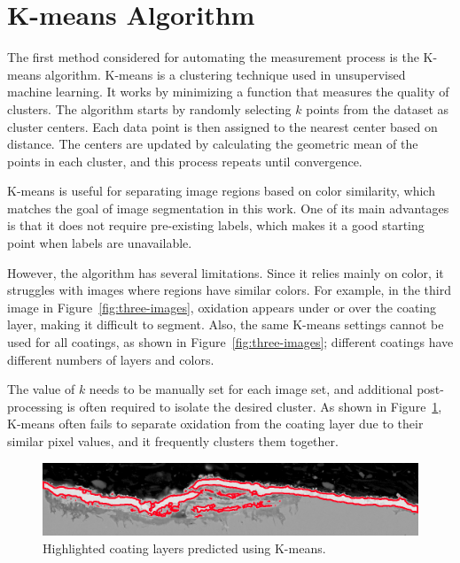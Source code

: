 \section{K-means Algorithm}\label{sec:kmeans}

The first method considered for automating the measurement process is the K-means algorithm.
K-means \cite{lloyd1982least} is a clustering technique used in unsupervised machine learning. It works by minimizing a function that measures the quality of clusters. The algorithm starts by randomly selecting $k$ points from the dataset as cluster centers. Each data point is then assigned to the nearest center based on distance. The centers are updated by calculating the geometric mean of the points in each cluster, and this process repeats until convergence.

K-means is useful for separating image regions based on color similarity, which matches the goal of image segmentation in this work. One of its main advantages is that it does not require pre-existing labels, which makes it a good starting point when labels are unavailable.

However, the algorithm has several limitations. Since it relies mainly on color, it struggles with images where regions have similar colors. For example, in the third image in Figure~\ref{fig:three-images}, oxidation appears under or over the coating layer, making it difficult to segment. Also, the same K-means settings cannot be used for all coatings, as shown in Figure~\ref{fig:three-images}; different coatings have different numbers of layers and colors.

The value of $k$ needs to be manually set for each image set, and additional post-processing is often required to isolate the desired cluster. As shown in Figure~\ref{fig:kmean}, K-means often fails to separate oxidation from the coating layer due to their similar pixel values, and it frequently clusters them together.

\begin{figure} [H]
    \centering 
    \includegraphics[width=0.8\linewidth]{PICTURES/kmeans/04.png} 
    \caption{Highlighted coating layers predicted using K-means.} 
    \label{fig:kmean} 
\end{figure}